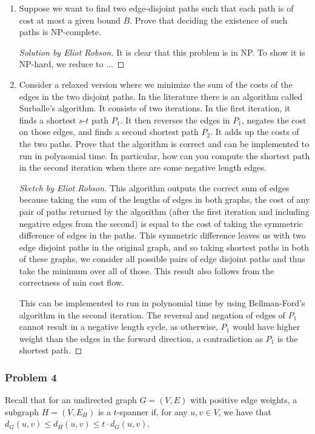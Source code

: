 \documentclass{article}
\newenvironment{sketch}[1]{\begin{proof}[Sketch by #1]}{\end{proof}}
\newenvironment{solution}[1]{\begin{proof}[Solution by #1]}{\end{proof}}
\begin{document}
\begin{enumerate}
    \item Suppose we want to find two edge-disjoint paths such that each path is of cost at most a given bound \(B\). Prove that deciding the existence of such paths is NP-complete.
    
    \begin{solution}{Eliot Robson}
        It is clear that this problem is in NP. To show it is NP-hard, we reduce to ...
    \end{solution}
    
    \item Consider a relaxed version where we minimize the sum of the costs of the edges in the two disjoint paths. In the literature there is an algorithm called Surballe's algorithm. It consists of two iterations. In the first iteration, it finds a shortest \(s\)-\(t\) path \(P_1\). It then reverses the edges in \(P_1\), negates the cost on those edges, and finds a second shortest path \(P_2\). It adds up the costs of the two paths. Prove that the algorithm is correct and can be implemented to run in polynomial time. In particular, how can you compute the shortest path in the second iteration when there are some negative length edges.
    
    \begin{sketch}{Eliot Robson}
        This algorithm outputs the correct sum of edges because taking the sum of the lengths of edges in both graphs, the cost of any pair of paths returned by the algorithm (after the first iteration and including negative edges from the second) is equal to the cost of taking the symmetric difference of edges in the paths. This symmetric difference leaves us with two edge disjoint paths in the original graph, and so taking shortest paths in both of these graphs, we consider all possible pairs of edge disjoint paths and thus take the minimum over all of those. This result also follows from the correctness of min cost flow.
        
        This can be implemented to run in polynomial time by using Bellman-Ford's algorithm in the second iteration. The reversal and negation of edges of \(P_1\) cannot result in a negative length cycle, as otherwise, \(P_1\) would have higher weight than the edges in the forward direction, a contradiction as \(P_1\) is the shortest path.
    \end{sketch}
\end{enumerate}

\subsubsection{Problem 4}
Recall that for an undirected graph \(G = (V,E)\) with positive edge weights, a subgraph \(H = (V, E_H)\) is a \(t\)-spanner if, for any \(u,v \in V\), we have that \(d_G (u,v) \leq d_H(u,v) \leq t \cdot d_G(u,v)\).
\end{document}
